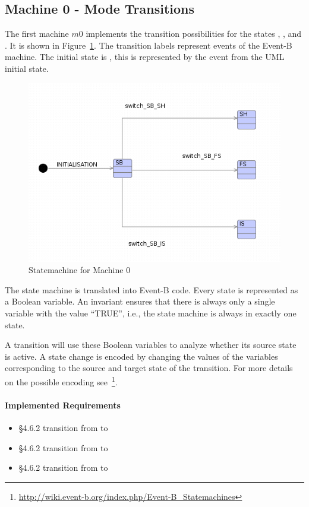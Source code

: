\documentclass{template/openetcs_article}
\begin{document}
\subsection{Machine 0 - Mode Transitions}
\label{sec:machine-0-mode}

The first machine $m0$ implements the transition possibilities for the states
, ,  and . It is shown in
Figure~\ref{fig:statemachine-m0}. The transition labels represent events of the
Event-B machine. The initial state is , this is represented by the
 event from the UML initial state.

\begin{figure}[ht]
  \centering
  \includegraphics[width=.75\textwidth]{statechart1}
  \caption{Statemachine for Machine 0}
  \label{fig:statemachine-m0}
\end{figure}

The state machine is translated into Event-B code. Every state is represented as
a Boolean variable. An invariant ensures that there is always only a single
variable with the value ``TRUE'', i.e., the state machine is always in exactly
one state.

A transition will use these Boolean variables to analyze whether its source
state is active. A state change is encoded by changing the values of the
variables corresponding to the source and target state of the transition. For
more details on the possible encoding
see~\footnote{\url{http://wiki.event-b.org/index.php/Event-B_Statemachines}}.

\paragraph{Implemented Requirements}
\label{sec:impl-requ}

\begin{itemize}
\item §4.6.2 transition from  to 
\item §4.6.2 transition from  to 
\item §4.6.2 transition from  to 
\end{itemize}
\end{document}
